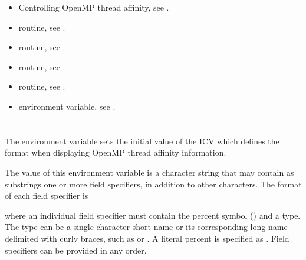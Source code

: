 \crossreferences
\begin{itemize}
\item Controlling OpenMP thread affinity, 
see .

\item {} routine, 
see .

\item {} routine, 
see .

\item {} routine, 
see .

\item {} routine, 
see .

\item {} environment variable, 
see .
\end{itemize}



\section{}
\label{sec:OMP_AFFINITY_FORMAT}

The  environment variable sets the initial value of the
 ICV which defines the format when displaying OpenMP
thread affinity information.


The value of this environment variable is a character string that may contain as
substrings one or more field specifiers, in addition to other characters.
The format of each field specifier is

\begin{ompSyntax}
\end{ompSyntax}

where an individual field specifier must contain the percent symbol ({\pcode{\%}}) and a type.
The type can be a single character short name or its corresponding long name delimited with curly braces,
 such as {} or {}.
A literal percent is specified as {\pcode{\%\%}}.  Field specifiers can be provided in any order.


